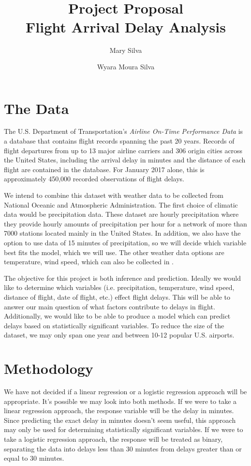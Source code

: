 \documentclass[a4paper, 12pt]{article}
\title{\textbf{Project Proposal \\ \small{Flight Arrival Delay Analysis}}}
\date{}
\author{Mary Silva \and Wyara Moura Silva}
\newcommand\tab[1][1cm]{\hspace*{#1}}
\begin{document}
\noindent
\maketitle

\section*{The Data}


\tab The U.S. Department of Transportation's \textit{Airline On-Time Performance Data}\cite{DOT} is a database that contains flight records spanning the past  20 years. Records of flight departures from up to 13 major airline carriers and 306 origin cities across the United States, including the arrival delay in minutes and the distance of each flight are contained in the database. For January 2017 alone, this is approximately 450,000 recorded observations of flight delays. 

We intend to combine this dataset with weather data to be collected from {National Oceanic and Atmospheric Administration}\cite{NOAA}. The first choice of climatic data would be precipitation data. These dataset are hourly precipitation where they provide hourly amounts of precipitation per hour for a network of more than 7000 stations located mainly in the United States. In addition, we also have the option to use data of 15 minutes of precipitation, so we will decide which variable best fits the model, which we will use. The other weather data options are temperature, wind speed, which can also be collected in \cite{NOAA}.


The objective for this project is both inference and prediction. Ideally we would like to determine which variables (i.e. precipitation, temperature, wind speed, distance of flight, date of flight, etc.) effect flight delays. This will be able to answer our main question of what factors contribute to delays in flight. Additionally, we would like to be able to produce a model which can predict delays based on statistically significant variables. To reduce the size of the dataset, we may only span one year and between 10-12 popular U.S. airports.



\section*{Methodology}

We have not decided if a linear regression or a logistic regression approach will be appropriate. It's possible we may look into both methods. If we were to take a linear regression approach, the response variable will be the delay in minutes. Since predicting the exact delay in minutes doesn't seem useful, this approach may only be used for determining statistically significant variables. If we were to take a logistic regression approach, the response will be treated as binary, separating the data into delays less than 30 minutes from delays greater than or equal to 30 minutes. 
\end{document}
